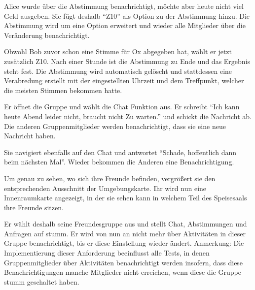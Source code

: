 \documentclass[parskip=full,11pt]{scrartcl}
\begin{document}
{Alice wurde über die Abstimmung benachrichtigt, möchte aber heute nicht viel Geld ausgeben.
Sie fügt deshalb \enquote{Z10} als Option zu der Abstimmung hinzu.}
{Die Abstimmung wird um eine Option erweitert und
wieder alle Mitglieder über die Veränderung benachrichtigt.}

{Obwohl Bob zuvor schon eine Stimme für Ox abgegeben hat, wählt er jetzt zusätzlich Z10.}
{Nach einer Stunde ist die Abstimmung zu Ende und das Ergebnis steht fest.
Die Abstimmung wird automatisch gelöscht und stattdessen eine Verabredung erstellt mit der
eingestellten Uhrzeit und dem Treffpunkt, welcher die meisten Stimmen bekommen hatte.}


{Er öffnet die Gruppe und wählt die Chat Funktion aus. Er schreibt \enquote{Ich kann heute Abend leider nicht, braucht nicht Zu warten.} und schickt die Nachricht ab.}
{Die anderen Gruppenmitglieder werden benachrichtigt, dass sie eine neue Nachricht haben.}

{Sie navigiert ebenfalls auf den Chat und antwortet \enquote{Schade, hoffentlich dann beim
nächsten Mal}.}
{Wieder bekommen die Anderen eine Benachrichtigung.}

{Um genau zu sehen, wo sich ihre Freunde befinden, vergrößert sie den entsprechenden
Ausschnitt der Umgebungskarte.}
{Ihr wird nun eine Innenraumkarte angezeigt, in der sie sehen kann in welchem Teil
des Speisesaals ihre Freunde sitzen.}


{Er wählt deshalb seine Freundesgruppe aus und stellt Chat, Abstimmungen und Anfragen auf stumm.}
{Er wird von nun an nicht mehr über Aktivitäten in dieser Gruppe benachrichtigt,
bis er diese Einstellung wieder ändert.}
Anmerkung: Die Implementierung dieser Anforderung beeinflusst alle Tests, in denen
Gruppenmitglieder über Aktivitäten benachrichtigt werden insofern, dass diese Benachrichtigungen
manche Mitglieder nicht erreichen, wenn diese die Gruppe stumm geschaltet haben.
\end{document}
